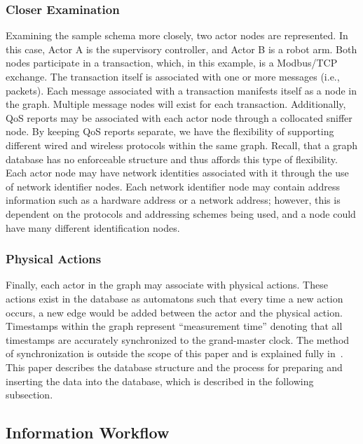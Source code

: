 \subsubsection{Closer Examination}
Examining the sample schema more closely, two actor nodes are represented.  In this case, Actor A is the supervisory controller, and Actor B is a robot arm.  Both nodes participate in a transaction, which, in this example, is a Modbus/TCP exchange. The transaction itself is associated with one or more messages (i.e., packets). Each message associated with a transaction manifests itself as a node in the graph. Multiple message nodes will exist for each transaction. 
Additionally, QoS reports may be associated with each actor node through a collocated sniffer node.  By keeping QoS reports separate, we have the flexibility of supporting different wired and wireless protocols within the same graph. Recall, that a graph database has no enforceable structure and thus affords this type of flexibility. Each actor node may have network identities associated with it through the use of network identifier nodes.  Each network identifier node may contain address information such as a hardware address or a network address; however, this is dependent on the protocols and addressing schemes being used, and a node could have many different identification nodes. 
\subsubsection{Physical Actions}
Finally, each actor in the graph may associate with physical actions.  These actions exist in the database as automatons such that every time a new action occurs, a new edge would be added between the actor and the physical action.  Timestamps within the graph represent ``measurement time'' denoting that all  timestamps are accurately synchronized to the grand-master clock.  The method of synchronization is outside the scope of this paper and is explained fully in~\cite{Liu2019vancouver}.  This paper describes the database structure and the process for preparing and inserting the data into the database, which is described in the following subsection.

\subsection{Information Workflow}

